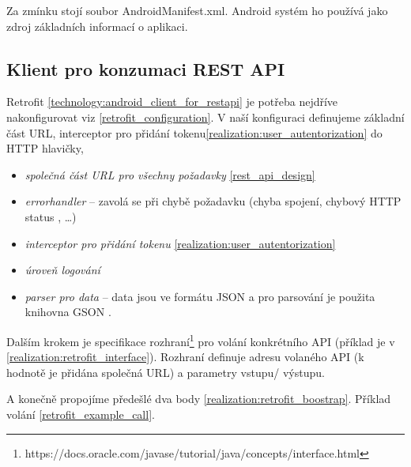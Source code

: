 \documentclass[thesis=B,czech]{FITthesis}[2012/06/26]
\begin{document}
Za zmínku stojí soubor AndroidManifest.xml. Android systém ho používá jako zdroj základních informací o aplikaci\cite{realization_androi_manifest}. 

\subsection{Klient pro konzumaci REST API}

Retrofit \ref{technology:android_client_for_restapi} je potřeba nejdříve nakonfigurovat viz \ref{retrofit_configuration}. V naší konfiguraci definujeme základní část URL, interceptor pro přidání tokenu\ref{realization:user_autentorization} do HTTP hlavičky,
\begin{itemize}[nosep]
	\item \textit{společná část URL pro všechny požadavky} \ref{rest_api_design} 
	\item \textit{errorhandler} -- zavolá se při chybě požadavku (chyba spojení, chybový HTTP status \cite{http_statuses}, \dots)
	\item \textit{interceptor pro přidání tokenu} \ref{realization:user_autentorization}
	\item \textit{úroveň logování}
	\item \textit{parser pro data} -- data jsou ve formátu JSON a pro parsování je použita knihovna GSON \cite{retrofit_gson}.
\end{itemize}



Dalším krokem je specifikace rozhraní\footnote{https://docs.oracle.com/javase/tutorial/java/concepts/interface.html} pro volání konkrétního API (příklad je v \ref{realization:retrofit_interface}). Rozhraní definuje adresu volaného API (k hodnotě je přidána společná URL) a parametry vstupu/ výstupu.



A konečně propojíme předešlé dva body \ref{realization:retrofit_boostrap}. Příklad volání \ref{retrofit_example_call}.




\end{document}
